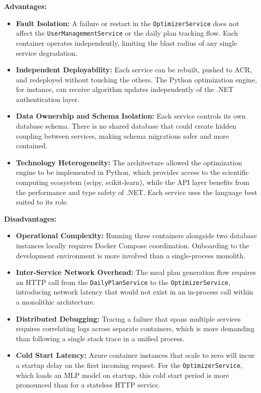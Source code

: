 \textbf{Advantages:}
\begin{itemize}
    \item \textbf{Fault Isolation:} A failure or restart in the \texttt{OptimizerService}
    does not affect the \newline\texttt{UserManagementService} or the daily plan 
    tracking flow. Each container operates independently, limiting the blast radius of 
    any single service degradation.

    \item \textbf{Independent Deployability:} Each service can be rebuilt, pushed to ACR,
    and redeployed without touching the others. The Python optimization engine, for
    instance, can receive algorithm updates independently of the .NET authentication layer.

    \item \textbf{Data Ownership and Schema Isolation:} Each service controls its own
    database schema. There is no shared database that could create hidden coupling between
    services, making schema migrations safer and more contained.

    \item \textbf{Technology Heterogeneity:} The architecture allowed the optimization
    engine to be implemented in Python, which provides access to the scientific computing
    ecosystem (scipy, scikit-learn), while the API layer benefits from the performance and
    type safety of .NET. Each service uses the language best suited to its role.
\end{itemize}

\textbf{Disadvantages:}
\begin{itemize}
    \item \textbf{Operational Complexity:} Running three containers alongside two database
    instances locally requires Docker Compose coordination. Onboarding to the development
    environment is more involved than a single-process monolith.

    \item \textbf{Inter-Service Network Overhead:} The meal plan generation flow requires
    an HTTP call from the \texttt{DailyPlanService} to the \texttt{OptimizerService},
    introducing network latency that would not exist in an in-process call within a
    monolithic architecture.

    \item \textbf{Distributed Debugging:} Tracing a failure that spans multiple services
    requires correlating logs across separate containers, which is more demanding than
    following a single stack trace in a unified process.

    \item \textbf{Cold Start Latency:} Azure container instances that scale to zero
    will incur a startup delay on the first incoming request. For the
    \texttt{OptimizerService}, which loads an MLP model on startup, this cold start
    period is more pronounced than for a stateless HTTP service.
\end{itemize}